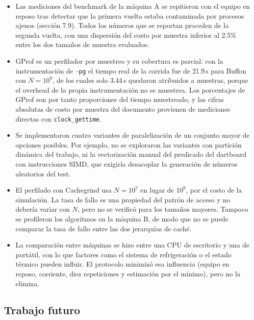 \begin{itemize}
    \item Las mediciones del benchmark de la máquina A se repitieron con el equipo en reposo tras detectar que la primera vuelta estaba contaminada por procesos ajenos (sección 7.9). Todos los números que se reportan proceden de la segunda vuelta, con una dispersión del costo por muestra inferior al 2.5\% entre los dos tamaños de muestra evaluados.
    \item GProf es un perfilador por muestreo y su cobertura es parcial: con la instrumentación de \texttt{-pg} el tiempo real de la corrida fue de 21.9\,s para Buffon con $N=10^9$, de los cuales solo 3.44\,s quedaron atribuidos a muestras, porque el overhead de la propia instrumentación no se muestrea. Los porcentajes de GProf son por tanto proporciones del tiempo muestreado, y las cifras absolutas de costo por muestra del documento provienen de mediciones directas con \texttt{clock\_gettime}.
    \item Se implementaron cuatro variantes de paralelización de un conjunto mayor de opciones posibles. Por ejemplo, no se exploraron las variantes con partición dinámica del trabajo, ni la vectorización manual del predicado del dartboard con instrucciones SIMD, que exigiría desacoplar la generación de números aleatorios del test.
    \item El perfilado con Cachegrind usa $N = 10^7$ en lugar de $10^9$, por el costo de la simulación. La tasa de fallo es una propiedad del patrón de acceso y no debería variar con $N$, pero no se verificó para los tamaños mayores. Tampoco se profileron los algoritmos en la máquina B, de modo que no se puede comparar la tasa de fallo entre las dos jerarquías de caché.
    \item La comparación entre máquinas se hizo entre una CPU de escritorio y una de portátil, con lo que factores como el sistema de refrigeración o el estado térmico pueden influir. El protocolo minimizó esa influencia (equipo en reposo, corriente, diez repeticiones y estimación por el mínimo), pero no la elimina.
\end{itemize}

\subsection{Trabajo futuro}

